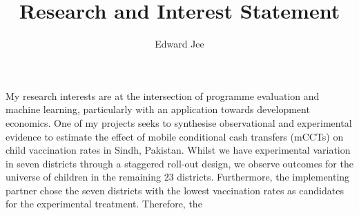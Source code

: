 \documentclass{article}
\author{Edward Jee}
\title{Research and Interest Statement}
\begin{document}
\maketitle

My research interests are at the intersection of programme evaluation and machine 
learning, particularly with an application towards development economics. One 
of my projects seeks to synthesise observational and experimental evidence to 
estimate the effect of mobile conditional cash transfers (mCCTs) on 
child vaccination rates in Sindh, Pakistan. Whilst we have experimental variation 
in seven districts through a staggered roll-out design, we observe outcomes for 
the universe of children in the remaining 23 districts. Furthermore, the implementing 
partner chose the seven districts with the lowest vaccination rates as candidates 
for the experimental treatment. Therefore, the 



    
\end{document}
